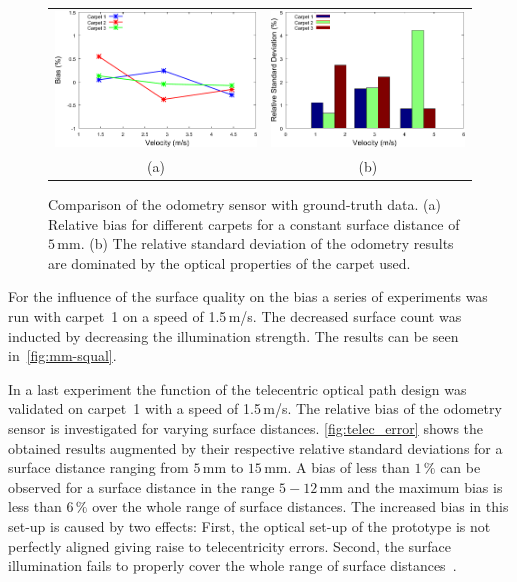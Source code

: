 \documentclass[12pt,a4paper]{article}
\begin{document}
\begin{figure}[t]
\begin{center}
\begin{tabular}{cc}
\includegraphics[width=0.47\columnwidth]{figures/mm_bias} &
\includegraphics[width=0.47\columnwidth]{figures/mm_dev} \\
(a) & (b) \\
\end{tabular}
\caption{\label{fig:bias}
Comparison of the odometry sensor with ground-truth data. (a) Relative bias for different carpets for a constant
surface distance of $5\,$mm. (b) The relative standard deviation of the odometry results are dominated by the
optical properties of the carpet used.}
\end{center}
\end{figure}

For the influence of the surface quality on the bias a series of experiments was run with carpet~1 on a speed of 1.5\,m/s.
The decreased surface count was inducted by decreasing the illumination strength.
The results can be seen in~\autoref{fig:mm-squal}.


In a last experiment the function of the telecentric optical path design was validated on carpet~1 with a speed of 1.5\,m/s.
The relative bias of the odometry sensor is investigated for varying surface distances.
\autoref{fig:telec_error} shows the obtained results augmented by their respective relative standard deviations for a surface distance ranging from $5\,$mm to $15\,$mm. 
A bias of less than $1\,\%$ can be observed for a surface distance in the range $5-12\,$mm and the maximum bias is less than $6\,\%$ over the whole range of surface distances.
The increased bias in this set-up is caused by two effects: First, the optical set-up of the prototype is not perfectly aligned giving raise to telecentricity errors. 
Second, the surface illumination fails to properly cover the whole range of surface distances~\cite{i2mtc}.
\end{document}
